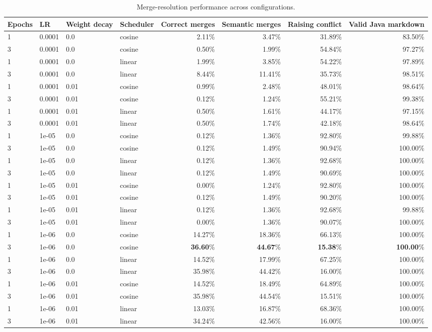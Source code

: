 \begin{table}[ht]
\centering
\begin{tabular}{l l l l r r r r}
\toprule
Epochs & LR & Weight decay & Scheduler & Correct merges & Semantic merges & Raising conflict & Valid Java markdown \\
\midrule
1 & 0.0001 & 0.0 & cosine & 2.11\% & 3.47\% & 31.89\% & 83.50\% \\
3 & 0.0001 & 0.0 & cosine & 0.50\% & 1.99\% & 54.84\% & 97.27\% \\
1 & 0.0001 & 0.0 & linear & 1.99\% & 3.85\% & 54.22\% & 97.89\% \\
3 & 0.0001 & 0.0 & linear & 8.44\% & 11.41\% & 35.73\% & 98.51\% \\
1 & 0.0001 & 0.01 & cosine & 0.99\% & 2.48\% & 48.01\% & 98.64\% \\
3 & 0.0001 & 0.01 & cosine & 0.12\% & 1.24\% & 55.21\% & 99.38\% \\
1 & 0.0001 & 0.01 & linear & 0.50\% & 1.61\% & 44.17\% & 97.15\% \\
3 & 0.0001 & 0.01 & linear & 0.50\% & 1.74\% & 42.18\% & 98.64\% \\
1 & 1e-05 & 0.0 & cosine & 0.12\% & 1.36\% & 92.80\% & 99.88\% \\
3 & 1e-05 & 0.0 & cosine & 0.12\% & 1.49\% & 90.94\% & 100.00\% \\
1 & 1e-05 & 0.0 & linear & 0.12\% & 1.36\% & 92.68\% & 100.00\% \\
3 & 1e-05 & 0.0 & linear & 0.12\% & 1.49\% & 90.69\% & 100.00\% \\
1 & 1e-05 & 0.01 & cosine & 0.00\% & 1.24\% & 92.80\% & 100.00\% \\
3 & 1e-05 & 0.01 & cosine & 0.12\% & 1.49\% & 90.20\% & 100.00\% \\
1 & 1e-05 & 0.01 & linear & 0.12\% & 1.36\% & 92.68\% & 99.88\% \\
3 & 1e-05 & 0.01 & linear & 0.00\% & 1.36\% & 90.07\% & 100.00\% \\
1 & 1e-06 & 0.0 & cosine & 14.27\% & 18.36\% & 66.13\% & 100.00\% \\
3 & 1e-06 & 0.0 & cosine & \textbf{36.60}\% & \textbf{44.67}\% & \textbf{15.38}\% & \textbf{100.00}\% \\
1 & 1e-06 & 0.0 & linear & 14.52\% & 17.99\% & 67.25\% & 100.00\% \\
3 & 1e-06 & 0.0 & linear & 35.98\% & 44.42\% & 16.00\% & 100.00\% \\
1 & 1e-06 & 0.01 & cosine & 14.52\% & 18.49\% & 64.89\% & 100.00\% \\
3 & 1e-06 & 0.01 & cosine & 35.98\% & 44.54\% & 15.51\% & 100.00\% \\
1 & 1e-06 & 0.01 & linear & 13.03\% & 16.87\% & 68.36\% & 100.00\% \\
3 & 1e-06 & 0.01 & linear & 34.24\% & 42.56\% & 16.00\% & 100.00\% \\
\bottomrule
\end{tabular}
\caption{Merge-resolution performance across configurations.}
\end{table}
